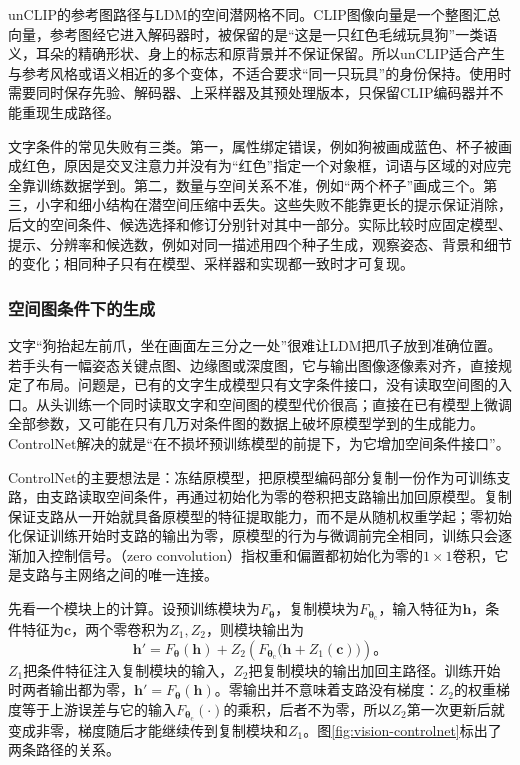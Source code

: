 unCLIP的参考图路径与LDM的空间潜网格不同。CLIP图像向量是一个整图汇总向量，参考图经它进入解码器时，被保留的是“这是一只红色毛绒玩具狗”一类语义，耳朵的精确形状、身上的标志和原背景并不保证保留。所以unCLIP适合产生与参考风格或语义相近的多个变体，不适合要求“同一只玩具”的身份保持。使用时需要同时保存先验、解码器、上采样器及其预处理版本，只保留CLIP编码器并不能重现生成路径。

文字条件的常见失败有三类。第一，属性绑定错误，例如狗被画成蓝色、杯子被画成红色，原因是交叉注意力并没有为“红色”指定一个对象框，词语与区域的对应完全靠训练数据学到。第二，数量与空间关系不准，例如“两个杯子”画成三个。第三，小字和细小结构在潜空间压缩中丢失。这些失败不能靠更长的提示保证消除，后文的空间条件、候选选择和修订分别针对其中一部分。实际比较时应固定模型、提示、分辨率和候选数，例如对同一描述用四个种子生成，观察姿态、背景和细节的变化；相同种子只有在模型、采样器和实现都一致时才可复现。

\subsubsection{空间图条件下的生成}
\label{sec:vision-generation-controlnet}

文字“狗抬起左前爪，坐在画面左三分之一处”很难让LDM把爪子放到准确位置。若手头有一幅姿态关键点图、边缘图或深度图，它与输出图像逐像素对齐，直接规定了布局。问题是，已有的文字生成模型只有文字条件接口，没有读取空间图的入口。从头训练一个同时读取文字和空间图的模型代价很高；直接在已有模型上微调全部参数，又可能在只有几万对条件图的数据上破坏原模型学到的生成能力。ControlNet解决的就是“在不损坏预训练模型的前提下，为它增加空间条件接口”。

ControlNet的主要想法是：冻结原模型，把原模型编码部分复制一份作为可训练支路，由支路读取空间条件，再通过初始化为零的卷积把支路输出加回原模型。复制保证支路从一开始就具备原模型的特征提取能力，而不是从随机权重学起；零初始化保证训练开始时支路的输出为零，原模型的行为与微调前完全相同，训练只会逐渐加入控制信号。（zero convolution）指权重和偏置都初始化为零的$1\times1$卷积，它是支路与主网络之间的唯一连接。

先看一个模块上的计算。设预训练模块为$F_{\bm{\theta}}$，复制模块为$F_{\bm{\theta}_{\mathrm{c}}}$，输入特征为$\bm{h}$，条件特征为$\bm{c}$，两个零卷积为$Z_1,Z_2$，则模块输出为
\begin{equation}
 \bm{h}'=F_{\bm{\theta}}(\bm{h})+
 Z_2\!\left(F_{\bm{\theta}_{\mathrm{c}}}
       \bigl(\bm{h}+Z_1(\bm{c})\bigr)\right)\text{。}
 \label{eq:vision-controlnet}
\end{equation}
$Z_1$把条件特征注入复制模块的输入，$Z_2$把复制模块的输出加回主路径。训练开始时两者输出都为零，$\bm{h}'=F_{\bm{\theta}}(\bm{h})$。零输出并不意味着支路没有梯度：$Z_2$的权重梯度等于上游误差与它的输入$F_{\bm{\theta}_{\mathrm{c}}}(\cdot)$的乘积，后者不为零，所以$Z_2$第一次更新后就变成非零，梯度随后才能继续传到复制模块和$Z_1$。图\ref{fig:vision-controlnet}标出了两条路径的关系。

